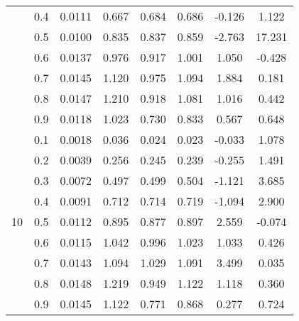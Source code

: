 \documentclass[11pt,a4paper]{report}
\begin{document}
\begin{longtable}{ | c | c || c | c | c | c | c | c | }
 & 0.4 & 0.0111 & 0.667 & 0.684 & 0.686 & -0.126 & 1.122 \\
 & 0.5 & 0.0100 & 0.835 & 0.837 & 0.859 & -2.763 & 17.231 \\
 & 0.6 & 0.0137 & 0.976 & 0.917 & 1.001 & 1.050 & -0.428 \\
 & 0.7 & 0.0145 & 1.120 & 0.975 & 1.094 & 1.884 & 0.181 \\
 & 0.8 & 0.0147 & 1.210 & 0.918 & 1.081 & 1.016 & 0.442 \\
 & 0.9 & 0.0118 & 1.023 & 0.730 & 0.833 & 0.567 & 0.648 \\
 \hline
\multirow{9}{*}{10} & 0.1 & 0.0018 & 0.036 & 0.024 & 0.023 & -0.033 & 1.078 \\
 & 0.2 & 0.0039 & 0.256 & 0.245 & 0.239 & -0.255 & 1.491 \\
 & 0.3 & 0.0072 & 0.497 & 0.499 & 0.504 & -1.121 & 3.685 \\
 & 0.4 & 0.0091 & 0.712 & 0.714 & 0.719 & -1.094 & 2.900 \\
 & 0.5 & 0.0112 & 0.895 & 0.877 & 0.897 & 2.559 & -0.074 \\
 & 0.6 & 0.0115 & 1.042 & 0.996 & 1.023 & 1.033 & 0.426 \\
 & 0.7 & 0.0143 & 1.094 & 1.029 & 1.091 & 3.499 & 0.035 \\
 & 0.8 & 0.0148 & 1.219 & 0.949 & 1.122 & 1.118 & 0.360 \\
 & 0.9 & 0.0145 & 1.122 & 0.771 & 0.868 & 0.277 & 0.724 \\
 \hline
\hline
\end{longtable}
\end{document}
